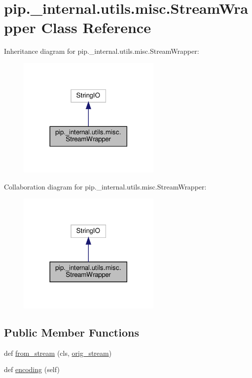 \hypertarget{classpip_1_1__internal_1_1utils_1_1misc_1_1StreamWrapper}{}\section{pip.\+\_\+internal.\+utils.\+misc.\+Stream\+Wrapper Class Reference}
\label{classpip_1_1__internal_1_1utils_1_1misc_1_1StreamWrapper}


Inheritance diagram for pip.\+\_\+internal.\+utils.\+misc.\+Stream\+Wrapper\+:
\nopagebreak
\begin{figure}[H]
\begin{center}
\leavevmode
\includegraphics[width=197pt]{classpip_1_1__internal_1_1utils_1_1misc_1_1StreamWrapper__inherit__graph}
\end{center}
\end{figure}


Collaboration diagram for pip.\+\_\+internal.\+utils.\+misc.\+Stream\+Wrapper\+:
\nopagebreak
\begin{figure}[H]
\begin{center}
\leavevmode
\includegraphics[width=197pt]{classpip_1_1__internal_1_1utils_1_1misc_1_1StreamWrapper__coll__graph}
\end{center}
\end{figure}
\subsection*{Public Member Functions}
\begin{DoxyCompactItemize}
\item 
def \hyperlink{classpip_1_1__internal_1_1utils_1_1misc_1_1StreamWrapper_a354e1a2153de36e8aa7fe8acf980d6b7}{from\+\_\+stream} (cls, \hyperlink{classpip_1_1__internal_1_1utils_1_1misc_1_1StreamWrapper_a394dbf777e6d17f817cced11f0101b89}{orig\+\_\+stream})
\item 
def \hyperlink{classpip_1_1__internal_1_1utils_1_1misc_1_1StreamWrapper_abd72847a018a5b210883a79e389ab598}{encoding} (self)
\end{DoxyCompactItemize}
